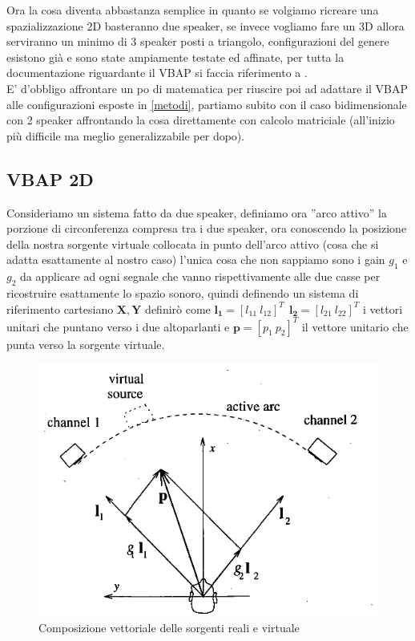 \documentclass[12pt,a4paper]{report}
\begin{document}
Ora la cosa diventa abbastanza semplice in quanto se volgiamo ricreare una spazializzazione 2D basteranno due speaker, se invece vogliamo fare un 3D allora serviranno un minimo di 3 speaker posti a triangolo, configurazioni del genere esistono già e sono state ampiamente testate ed affinate, per tutta la documentazione riguardante il VBAP si faccia riferimento a \cite{vbap}.\\

E' d'obbligo affrontare un po di matematica per riuscire poi ad adattare il VBAP alle configurazioni esposte in \ref{metodi}, partiamo subito con il caso bidimensionale con 2 speaker affrontando la cosa direttamente con calcolo matriciale (all'inizio più difficile ma meglio generalizzabile per dopo).\\

\subsection{VBAP 2D}\label{c}
Consideriamo un sistema fatto da due speaker, definiamo ora ''arco attivo'' la porzione di circonferenza compresa tra i due speaker, ora conoscendo la posizione della nostra sorgente virtuale collocata in punto dell'arco attivo (cosa che si adatta esattamente al nostro caso) l'unica cosa che non sappiamo sono i gain $g_1$ e $g_2$ da applicare ad ogni segnale che vanno rispettivamente alle due casse per ricostruire esattamente lo spazio sonoro, quindi definendo un sistema di riferimento cartesiano $ \boldsymbol{X},\boldsymbol{Y}$ definirò come $ \boldsymbol{l_{1}}= {\left[ l_{11} \ l_{12} \right]}^T \ \  \boldsymbol{l_{2}}= {\left[ l_{21} \ l_{22} \right]}^T$ i vettori unitari che puntano verso i due altoparlanti e $\boldsymbol{p}= {\left[ p_1 \ p_2 \right]}^T$ il vettore unitario che punta verso la sorgente virtuale.\\

\begin{figure}[htbp]
	\centering
	\includegraphics[scale=0.48]{figures/matrix2d.png}
	\caption {Composizione vettoriale delle sorgenti reali e virtuale}
	\label{fig:vettori2d}
	\end{figure}
\end{document}
